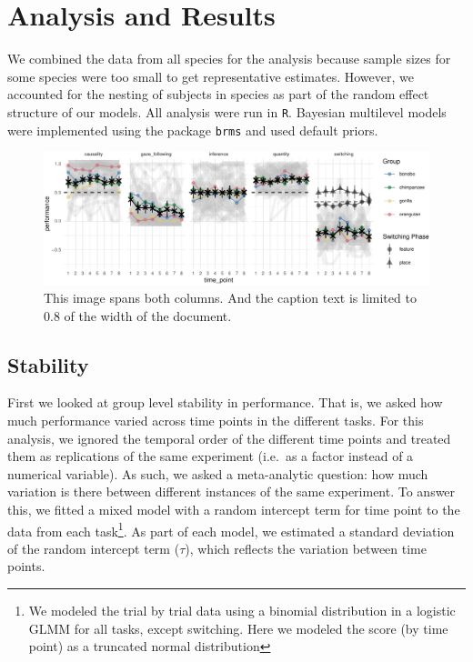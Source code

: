 \documentclass[10pt, letterpaper]{article}
\newenvironment{CodeChunk}{}{}
\begin{document}
\hypertarget{analysis-and-results}{%
\section{Analysis and Results}\label{analysis-and-results}}

We combined the data from all species for the analysis because sample
sizes for some species were too small to get representative estimates.
However, we accounted for the nesting of subjects in species as part of
the random effect structure of our models. All analysis were run in
\texttt{R}. Bayesian multilevel models were implemented using the
package \texttt{brms} and used default priors.

\begin{CodeChunk}
\begin{figure}[h]

{\centering \includegraphics{figs/2-col-image-1} 

}

\caption[This image spans both columns]{This image spans both columns. And the caption text is limited to 0.8 of the width of the document.}\label{fig:2-col-image}
\end{figure}
\end{CodeChunk}

\hypertarget{stability}{%
\subsection{Stability}\label{stability}}

First we looked at group level stability in performance. That is, we
asked how much performance varied across time points in the different
tasks. For this analysis, we ignored the temporal order of the different
time points and treated them as replications of the same experiment
(i.e.~as a factor instead of a numerical variable). As such, we asked a
meta-analytic question: how much variation is there between different
instances of the same experiment. To answer this, we fitted a mixed
model with a random intercept term for time point to the data from each
task\footnote{We modeled the trial by trial data using a binomial
  distribution in a logistic GLMM for all tasks, except switching. Here
  we modeled the score (by time point) as a truncated normal
  distribution}. As part of each model, we estimated a standard
deviation of the random intercept term (\(\tau\)), which reflects the
variation between time points.
\end{document}
